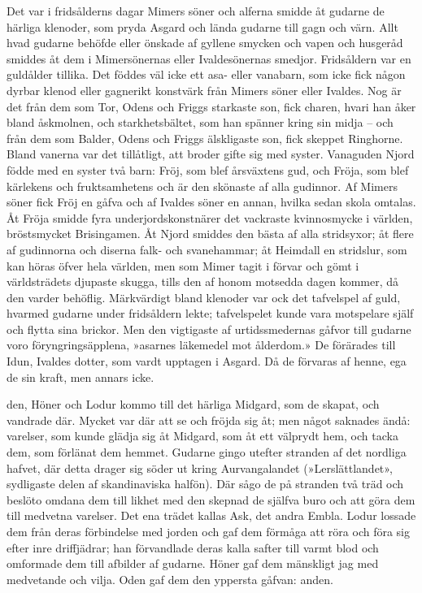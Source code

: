 Det var i fridsålderns dagar Mimers söner och alferna smidde åt gudarne
de härliga klenoder, som pryda Asgard och lända gudarne till gagn och
värn. Allt hvad gudarne behöfde eller önskade af gyllene smycken och
vapen och husgeråd smiddes åt dem i Mimersönernas eller Ivaldesönernas
smedjor. Fridsåldern var en guldålder tillika. Det föddes väl icke ett
asa- eller vanabarn, som icke fick någon dyrbar klenod eller gagnerikt
konstvärk från Mimers söner eller Ivaldes. Nog är det från dem som Tor,
Odens och Friggs starkaste son, fick charen, hvari han åker bland
åskmolnen, och starkhetsbältet, som han spänner kring sin midja -- och
från dem som Balder, Odens och Friggs älskligaste son, fick skeppet
Ringhorne. Bland vanerna var det tillåtligt, att broder gifte sig med
syster. Vanaguden Njord födde med en syster två barn: Fröj, som blef
årsväxtens gud, och Fröja, som blef kärlekens och fruktsamhetens och är
den skönaste af alla gudinnor. Af Mimers söner fick Fröj en
gåfva och af Ivaldes söner en annan, hvilka sedan skola omtalas. Åt
Fröja smidde fyra underjordskonstnärer det vackraste kvinnosmycke i
världen, bröstsmycket Brisingamen. Åt Njord smiddes den bästa af alla
stridsyxor; åt flere af gudinnorna och diserna falk- och svanehammar; åt
Heimdall en stridslur, som kan höras öfver hela världen, men som Mimer
tagit i förvar och gömt i världsträdets djupaste skugga, tills den af
honom motsedda dagen kommer, då den varder behöflig. Märkvärdigt bland
klenoder var ock det tafvelspel af guld, hvarmed gudarne under
fridsåldern lekte; tafvelspelet kunde vara motspelare själf och flytta
sina brickor. Men den vigtigaste af urtidssmedernas gåfvor till gudarne
voro föryngringsäpplena, »asarnes läkemedel mot ålderdom.» De förärades
till Idun, Ivaldes dotter, som vardt upptagen i Asgard. Då de förvaras
af henne, ega de sin kraft, men annars icke.



\dropcapO den, Höner och Lodur kommo till det härliga Mid\-gard, som de skapat, och
vandrade där. Mycket var där att se och fröjda sig åt; men något
saknades ändå: varelser, som kunde glädja sig åt Midgard, som åt ett
välprydt hem, och tacka dem, som förlänat dem hemmet. Gudarne gingo
utefter stranden af det nordliga hafvet, där detta drager sig söder ut
kring Aurvangalandet (»Lerslättlandet», sydligaste delen af
skandinaviska halfön). Där sågo de på stranden två träd och beslöto
omdana dem till likhet med den skepnad de själfva buro och att göra dem
till medvetna varelser. Det ena trädet kallas Ask, det andra Embla.
Lodur lossade dem från deras förbindelse med jorden och gaf dem förmåga
att röra och föra sig efter inre driffjädrar; han förvandlade deras
kalla safter till varmt blod och omformade dem till afbilder af gudarne.
Höner gaf dem mänskligt jag med medvetande och vilja. Oden gaf dem den
yppersta gåfvan: anden.

